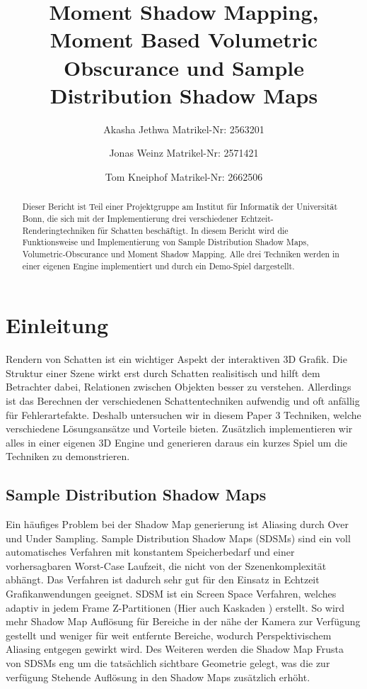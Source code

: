 \documentclass[runningheaders,a4paper]{llncs}
\title{ Moment Shadow Mapping, Moment Based Volumetric Obscurance und Sample Distribution Shadow Maps }
\author{
	Akasha Jethwa 
	Matrikel-Nr: 2563201
	\and
	Jonas Weinz 
	Matrikel-Nr: 2571421
	\and
	Tom Kneiphof 
	Matrikel-Nr: 2662506
}
\institute{Institut für Informatik der Universität Bonn}
\begin{document}
\maketitle

\begin{abstract}
Dieser Bericht ist Teil einer Projektgruppe am Institut für Informatik der Universität Bonn,
die sich mit der Implementierung drei verschiedener Echtzeit-Renderingtechniken für Schatten 
beschäftigt. In diesem Bericht wird die Funktionsweise und Implementierung von Sample Distribution Shadow Maps, 
Volumetric-Obscurance und Moment Shadow Mapping. Alle drei Techniken werden in einer eigenen Engine implementiert und
durch ein Demo-Spiel dargestellt.
\end{abstract}


\section{Einleitung}
Rendern von Schatten ist ein wichtiger Aspekt der interaktiven 3D Grafik.
Die Struktur einer Szene wirkt erst durch Schatten realisitisch und hilft dem Betrachter dabei, Relationen zwischen Objekten besser zu verstehen.
Allerdings ist das Berechnen der verschiedenen Schattentechniken aufwendig und oft anfällig für Fehlerartefakte.
Deshalb untersuchen wir in diesem Paper 3 Techniken, welche verschiedene Lösungsansätze und Vorteile bieten.
Zusätzlich implementieren wir alles in einer eigenen 3D Engine und generieren daraus ein kurzes Spiel um die Techniken zu demonstrieren.


\subsection{Sample Distribution Shadow Maps}

Ein häufiges Problem bei der Shadow Map generierung ist Aliasing durch Over und Under Sampling.
Sample Distribution Shadow Maps (SDSMs) \cite{sdsm} sind ein voll automatisches Verfahren mit konstantem Speicherbedarf und einer vorhersagbaren Worst-Case Laufzeit, die nicht von der Szenenkomplexität abhängt.
Das Verfahren ist dadurch sehr gut für den Einsatz in Echtzeit Grafikanwendungen geeignet.
SDSM ist ein Screen Space Verfahren, welches adaptiv in jedem Frame Z-Partitionen \cite{zpart} (Hier auch Kaskaden \cite{csm}) erstellt.
So wird mehr Shadow Map Auflösung für Bereiche in der nähe der Kamera zur Verfügung gestellt und weniger für weit entfernte Bereiche, wodurch Perspektivischem Aliasing entgegen gewirkt wird.
Des Weiteren werden die Shadow Map Frusta von SDSMs eng um die tatsächlich sichtbare Geometrie gelegt, was die zur verfügung Stehende Auflösung in den Shadow Maps zusätzlich erhöht.
\end{document}

